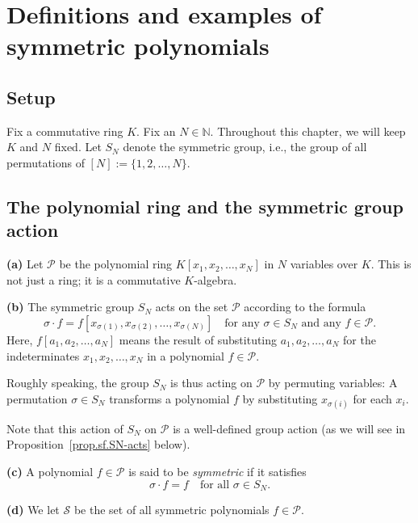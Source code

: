 \section{Definitions and examples of symmetric polynomials}

\subsection{Setup}

\begin{convention}
\label{conv.sf.KN}
Fix a commutative ring $K$. Fix an $N\in\mathbb{N}$.
Throughout this chapter, we will keep $K$ and $N$ fixed.
Let $S_N$ denote the symmetric group, i.e., the group of all
permutations of $[N] := \{1,2,\ldots,N\}$.
\end{convention}

\subsection{The polynomial ring and the symmetric group action}

\begin{definition}
\label{def.sf.PS}
\leantarget
\leanok
\textbf{(a)} Let $\mathcal{P}$ be the polynomial ring
$K[x_1, x_2, \ldots, x_N]$ in $N$ variables over $K$. This
is not just a ring; it is a commutative $K$-algebra. \medskip

\textbf{(b)} The symmetric group $S_N$ acts on the set $\mathcal{P}$
according to the formula
\[
\sigma \cdot f = f[x_{\sigma(1)}, x_{\sigma(2)}, \ldots, x_{\sigma(N)}]
\quad \text{for any } \sigma \in S_N \text{ and any } f \in \mathcal{P}.
\]
Here, $f[a_1, a_2, \ldots, a_N]$ means the result of
substituting $a_1, a_2, \ldots, a_N$ for the indeterminates $x_1, x_2, \ldots, x_N$
in a polynomial $f \in \mathcal{P}$.

Roughly speaking, the group $S_N$ is thus acting on $\mathcal{P}$ by
permuting variables: A permutation $\sigma \in S_N$ transforms a polynomial
$f$ by substituting $x_{\sigma(i)}$ for each $x_i$.

Note that this action of $S_N$ on $\mathcal{P}$ is a well-defined group
action (as we will see in Proposition~\ref{prop.sf.SN-acts} below). \medskip

\textbf{(c)} A polynomial $f \in \mathcal{P}$ is said to be \emph{symmetric} if
it satisfies
\[
\sigma \cdot f = f \quad \text{for all } \sigma \in S_N.
\]

\textbf{(d)} We let $\mathcal{S}$ be the set of all symmetric polynomials
$f \in \mathcal{P}$.
\end{definition}

